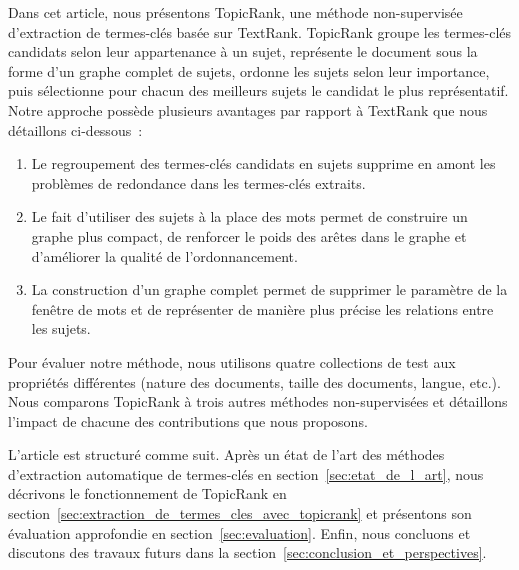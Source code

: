   Dans cet article, nous présentons TopicRank, une méthode non-supervisée d'extraction de termes-clés basée sur TextRank.
  TopicRank groupe les termes-clés candidats selon leur appartenance à un sujet, représente le document sous la forme d'un graphe complet de sujets, ordonne les sujets selon leur importance, puis sélectionne pour chacun des meilleurs sujets le candidat le plus représentatif.
  Notre approche possède plusieurs avantages par rapport à TextRank que nous détaillons ci-dessous~:
  \begin{enumerate}
    \item Le regroupement des termes-clés candidats en sujets supprime en amont les problèmes de redondance dans les termes-clés extraits.
    \item Le fait d'utiliser des sujets à la place des mots permet de construire un graphe plus compact, de renforcer le poids des arêtes dans le graphe et d'améliorer la qualité de l'ordonnancement.
    \item La construction d'un graphe complet permet de supprimer le paramètre de la fenêtre de mots et de représenter de manière plus précise les relations entre les sujets.
  \end{enumerate}

  Pour évaluer notre méthode, nous utilisons quatre collections de test aux propriétés différentes (nature des documents, taille des documents, langue, etc.).
  Nous comparons TopicRank à trois autres méthodes non-supervisées et détaillons l'impact de chacune des contributions que nous proposons.

  L'article est structuré comme suit.
  Après un état de l'art des méthodes d'extraction automatique de termes-clés en section~\ref{sec:etat_de_l_art}, nous décrivons le fonctionnement de TopicRank en section~\ref{sec:extraction_de_termes_cles_avec_topicrank} et présentons son évaluation approfondie en section~\ref{sec:evaluation}.
  Enfin, nous concluons et discutons des travaux futurs dans la section~\ref{sec:conclusion_et_perspectives}.
